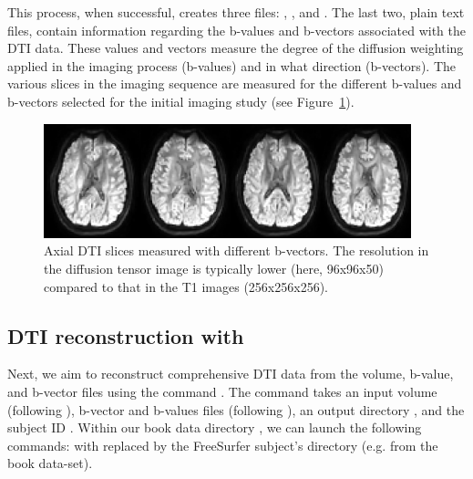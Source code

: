 This process, when successful, creates three files: ,
, and .  The last two, plain
text files, contain information regarding the b-values and
b-vectors associated with the DTI data. These values and vectors
measure the degree of the diffusion weighting applied in the imaging
process (b-values) and in what direction (b-vectors). The various
slices in the imaging sequence are measured for the different b-values
and b-vectors selected for the initial imaging study (see
Figure~\ref{fig:chp5:DTIslices}).
\begin{figure}	
\begin{center}
  \includegraphics[width=0.95\textwidth]{./graphics/chp5/dwi.png}
\end{center}
\caption{Axial DTI slices measured with different b-vectors. The
  resolution in the diffusion tensor image is typically lower (here, 96x96x50)
	compared to that in the T1 images (256x256x256).}
\label{fig:chp5:DTIslices}
\end{figure}

\subsection{DTI reconstruction with \freesurfer}
\label{sec:chp-dti:freesurfer-dtrecon}
Next, we aim to reconstruct comprehensive DTI data from the volume,
b-value, and b-vector files using the \freesurfer{} command
. The command takes an input volume (following
), b-vector and b-values files (following ), an
output directory , and the  subject ID
. Within our book data directory , we
can launch the following commands:
\noindent with  replaced by the FreeSurfer subject's
directory (e.g.  from the book data-set).

